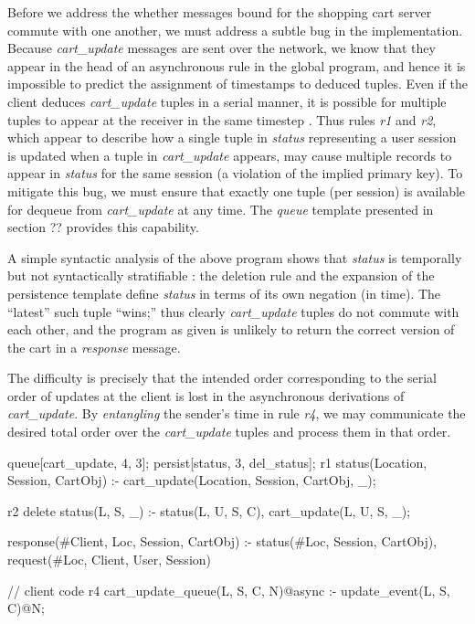 Before we address the whether messages bound for the shopping cart server commute 
with one another, we must address a subtle bug in the implementation.  Because {\em cart\_update}
messages are sent over the network, we know that they appear in the head of an asynchronous 
rule in the global program, and hence it is impossible to predict the assignment of timestamps
to deduced tuples.  Even if the client deduces {\em cart\_update} tuples in a serial manner, it
is possible for multiple tuples to appear at the receiver in the same timestep .  Thus rules {\em r1} 
and {\em r2}, which appear to describe how a single tuple in {\em status} representing a user
session is updated when a tuple in {\em cart\_update} appears, may cause multiple records
to appear in {\em status} for the same session (a violation of the implied primary key).
To mitigate this bug, we must ensure that exactly one tuple (per session) is available for dequeue
from {\em cart\_update} at any time.  The \emph{queue} template presented in section ?? 
provides this capability.

A simple syntactic analysis of the above program shows that {\em status} 
is temporally but not syntactically stratifiable : the deletion rule and the expansion of the
persistence template define {\em status} in terms of its own negation (in time).  The ``latest''
such tuple ``wins;'' thus clearly {\em cart\_update} tuples do not commute with each other,
and the program as given is unlikely to return the correct version of the cart in a {\em response}
message.

The difficulty is precisely that the intended order corresponding to the serial order of updates
at the client is lost in the asynchronous derivations of {\em cart\_update}.  By \emph{entangling}
the sender's time in rule  {\em r4}, we may communicate the desired total order over 
the {\em cart\_update} tuples and process them in that order.  

\begin{Dedalus}
queue[cart_update, 4, 3];
persist[status, 3, del_status];
r1
status(Location, Session, CartObj) :-
    cart_update(Location,  Session, CartObj, _);
    
r2
delete status(L, S, _) :-
    status(L, U, S, C), cart_update(L, U, S, _);

response(#Client, Loc, Session, CartObj) :-
    status(#Loc, Session, CartObj),
    request(#Loc, Client, User, Session)

// client code
r4
cart_update_queue(L, S, C, N)@async :- 
    update_event(L, S, C)@N;
\end{Dedalus}

